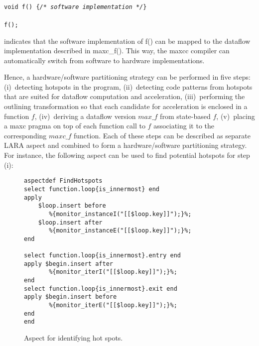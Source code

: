 \noindent\texttt{\footnotesize{} \\
void f() \{\emph{/* software implementation */}\} \\
 \\
f(); \\
}

\noindent indicates that the software implementation of f() can be mapped to the dataflow implementation described in maxc\_f(). This way, the maxcc compiler can automatically switch from software to hardware implementations.

Hence, a hardware/software partitioning strategy can be performed in five steps: (i)~detecting hotspots in the program, (ii)~detecting code patterns from hotspots that are suited for dataflow computation and acceleration, (iii)~performing the outlining transformation so that each candidate for acceleration is enclosed in a function $f$, (iv)~deriving a dataflow version $max\_f$ from state-based $f$, (v)~placing a maxc pragma on top of each function call to $f$ associating it to the corresponding $maxc\_f$ function. Each of these steps can be described as separate LARA aspect and combined to form a hardware/software partitioning strategy. For instance, the following aspect can be used to find potential hotspots for step (i):

\lstset{style=lara}
\begin{figure}[!h]
\begin{lstlisting}
aspectdef FindHotspots
select function.loop{is_innermost} end
apply
    $loop.insert before
       %{monitor_instanceI("[[$loop.key]]");}%;
    $loop.insert after
       %{monitor_instanceE("[[$loop.key]]");}%;
end

select function.loop{is_innermost}.entry end
apply $begin.insert after
       %{monitor_iterI("[[$loop.key]]");}%;
end
select function.loop{is_innermost}.exit end
apply $begin.insert before
       %{monitor_iterE("[[$loop.key]]");}%;
end
end
\end{lstlisting}
\caption{Aspect for identifying hot spots.}
\end{figure}

